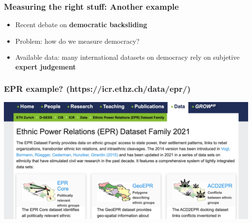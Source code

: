 \documentclass[aspectratio=43]{beamer}
\begin{document}
\begin{frame}
\frametitle{Measuring the right stuff: Another example}
\centering

\begin{itemize}
  \item Recent debate on \textbf{democratic backsliding}
  \item Problem: how do we measure democracy?
  \item Available data: many international datasets on democracy rely on subjetive \textbf{expert judgement}
\end{itemize}

\end{frame}

\begin{frame}
\frametitle{EPR example? (https://icr.ethz.ch/data/epr/)}
\centering

\includegraphics[width = \textwidth]{../img/epr1}

\end{frame}
\end{document}

